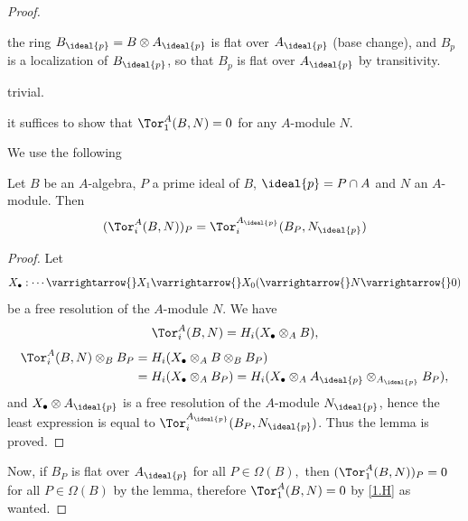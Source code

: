 \documentclass[../main]{subfiles}
\begin{document}
\begin{proof}\phantom{,}
\begin{implyenumerate}
    \item[$(1)\implies(2)$] the ring $B_{\ideal{p}} = B \otimes A_{\ideal{p}}$ is flat over $A_{\ideal{p}}$ (base change), and $B_p$ is a localization of $B_{\ideal{p}}$, so that $B_p$ is flat over $A_{\ideal{p}}$ by transitivity.
    \item[$(2) \implies (3)$] trivial.
    \item[$(3) \implies (1)$] it suffices to show that $\Tor_1^A(B,N)=0$ for any $A$-module $N$.
\end{implyenumerate}

We use the following

\begin{lemma}
    Let $B$ be an $A$-algebra, $P$ a prime ideal of $B$, $\ideal{p} = P \cap A $ and $N$ an $A$-module. Then
    \[
        (\Tor_i^A(B,N))_P = \Tor_i^{A_{\ideal{p}}}(B_P, N_{\ideal{p}}) 
    \] 
\end{lemma}

\begin{proof} 
Let \[X_\bullet: \cdots \varrightarrow{} X_1 \varrightarrow{} X_0 ( \varrightarrow{} N \varrightarrow{} 0)\] be a free resolution of the $A$-module $N$. We have 
\[\Tor_i^A(B,N)= H_i(X_\bullet \otimes_A B),\]
\[\begin{aligned}
    \Tor_i^A(B,N) \otimes_BB_P&= H_i(X_\bullet \otimes_A B \otimes_B B_P )\\
    &= H_i(X_\bullet \otimes_A B_P) = H_i(X_\bullet \otimes_A A_{\ideal{p}}\otimes_{A_{\ideal{p} }}B_P),
\end{aligned}\]
and $X_\bullet \otimes A_{\ideal{p}}$ is a free resolution of the $A$-module $N_{\ideal{p}}$, hence the least expression is equal to $\Tor_i^{A_{\ideal{p}}}(B_P, N_{\ideal{p}})$. Thus the lemma is proved.
\end{proof}

Now, if $B_P$ is flat over $A_{\ideal{p}}$ for all $P \in \Omega(B),$ then $(\Tor_1^A(B,N) )_P = 0$ for all $P \in \Omega(B)$ by the lemma, therefore $\Tor_1^A(B,N)=0 $ by \ref{1.H} as wanted.
\end{proof}
\end{document}

